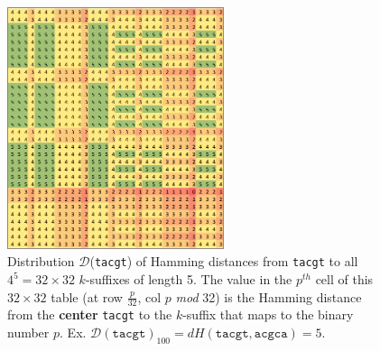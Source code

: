 \begin{figure}[h]
	\centering
	\label{fig:distribution}
	\includegraphics[width=2.5in]{contents/00_images/D(tacgt)}
	\caption{
		Distribution $\mathcal{D}$(\texttt{tacgt}) of Hamming distances from \texttt{tacgt} \cite{sia2015}
		to all $4^{5} = 32\times32$ $k$-suffixes of length 5.
		The value in the $p^{th}$ cell of this $32\times32$ table (at row $\frac{p}{32}$, col $p$ \emph{mod} 32) is the Hamming distance from the \textbf{center} \texttt{tacgt} to the $k$-suffix that maps to the binary number $p$.\newline
		Ex. $\mathcal{D}(\texttt{tacgt})_{100} = dH(\texttt{tacgt}, \texttt{acgca}) = 5$.\newline
	}
\end{figure} 